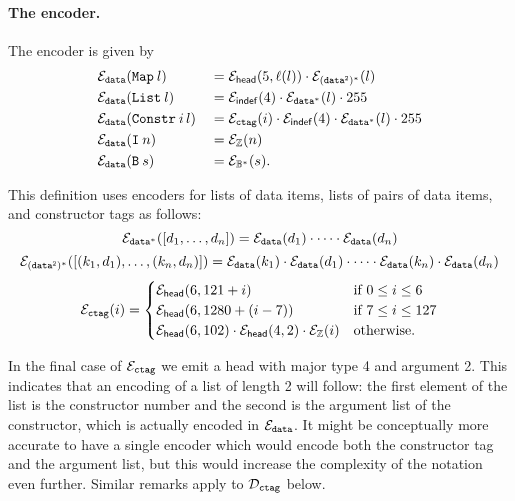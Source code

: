 \paragraph{The encoder.} The encoder is given by
\begin{alignat*}{2}
&  \mathcal{E}_{\mathtt{data}}(\mathtt{Map}\: l) && = \mathcal{E}_{\mathsf{head}}(5,\operatorname{\ell}(l)) \cdot \mathcal{E}_{\mathtt{(data^2)^*}}(l)\\ 
&  \mathcal{E}_{\mathtt{data}}(\mathtt{List}\: l) && = \mathcal{E}_{\mathsf{indef}}(4) \cdot \mathcal{E}_{\mathtt{data^*}}(l) \cdot 255\\ 
&  \mathcal{E}_{\mathtt{data}}(\mathtt{Constr}\: i\, l) && = \mathcal{E}_{\texttt{ctag}}(i) \cdot \mathcal{E}_{\mathsf{indef}}(4) \cdot  \mathcal{E}_{\mathtt{data^*}}(l) \cdot 255\\
& \mathcal{E}_{\mathtt{data}}(\mathtt{I}\: n) && = \mathcal{E}_{\mathbb{Z}}(n)\\ 
&  \mathcal{E}_{\mathtt{data}}(\mathtt{B}\: s) && = \mathcal{E}_{\mathbb{B}^*}(s).
\end{alignat*}

\noindent This definition uses encoders for lists of data items, lists of pairs
of data items, and constructor tags as follows:
$$
\mathcal{E}_{\mathtt{data^*}}([d_1, \ldots, d_n]) = \mathcal{E}_{\mathtt{data}}(d_1) \cdot \cdots \cdot \mathcal{E}_{\mathtt{data}}(d_n)
$$
$$
\mathcal{E}_{\mathtt{(data^2)^*}}([(k_1,d_1), \ldots, (k_n, d_n)]) = \mathcal{E}_{\mathtt{data}}(k_1) \cdot \mathcal{E}_{\mathtt{data}}(d_1) \cdot \cdots \cdot \mathcal{E}_{\mathtt{data}}(k_n) \cdot \mathcal{E}_{\mathtt{data}}(d_n)
$$
$$
\mathcal{E}_{\texttt{ctag}}(i) =
\begin{cases}
  \mathcal{E}_{\mathsf{head}}(6,121+i) & \text{if $0 \leq i \leq 6$}\\
  \mathcal{E}_{\mathsf{head}}(6,1280+(i-7)) & \text{if $7 \leq i \leq 127$}\\
  \mathcal{E}_{\mathsf{head}}(6,102) \cdot \mathcal{E}_{\mathsf{head}}(4,2) \cdot \mathcal{E}_{\mathbb{Z}}(i) & \text{otherwise}.\\
  \end{cases}
$$

\noindent 
In the final case of $\mathcal{E}_{\texttt{ctag}}$ we emit a head with major type 4 and argument
2. This indicates that an encoding of a list of length 2 will follow: the first
element of the list is the constructor number and the second is the argument
list of the constructor, which is actually encoded in $\mathcal{E}_{\mathtt{data}}$.  It might be
conceptually more accurate to have a single encoder which would encode both the
constructor tag and the argument list, but this would increase the complexity of
the notation even further.  Similar remarks apply to $\mathcal{D}_{\texttt{ctag}}$ below.



